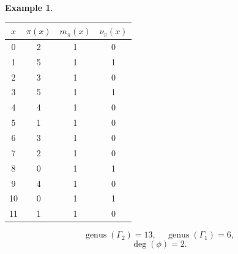 \documentclass[12pt,letterpaper]{article}
\theoremstyle{definition}
\newtheorem{example}[theorem]{Example}
\DeclareMathOperator{\genus}{genus}
\begin{document}
\begin{example}
{\begin{center}
\begin{tabular}{c|c|c|c}  
  $x$ & $\pi(x)$ & $m_\pi(x)$ & $\nu_\pi(x)$   \\ \hline
  0   &    2   &        1         &  0  \\ 
  1   &    5   &        1         &  1  \\ 
  2   &    3   &        1         &  0  \\ 
  3   &    5   &        1         &  1   \\
  4   &    4   &        1         &  0   \\
  5   &    1   &        1         &  0   \\
  6   &    3   &        1         &  0   \\
  7   &    2   &        1         &  0   \\
  8   &    0   &        1         &  1   \\
  9   &    4   &        1         &  0  \\   
  10  &    0  &         1         &  1  \\
  11  &    1   &        1         &  0  \\  
\end{tabular}
\end{center}

\[
  \genus(\Gamma_2) =13,\ \ \ \ \
  \genus(\Gamma_1) =6,
\]
\[
\deg(\phi) =2.
\]

}
\end{example}
\end{document}
